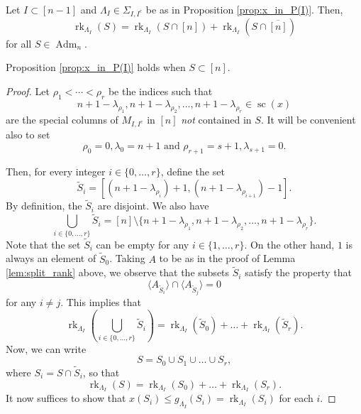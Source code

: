 \documentclass[10pt,a4paper]{amsart}
\DeclareMathOperator{\Adm}{Adm}
\DeclareMathOperator{\SC}{sc}
\DeclareMathOperator{\rk}{rk}
\begin{document}
\begin{lemma}\label{lem:split_rank}
    Let $I \subset [n-1]$ and $\Lambda_I \in \Sigma_{I,I^c}$ be as in Proposition \ref{prop:x_in_P(I)}. Then,
    \begin{equation*}
        \rk_{\Lambda_I}(S) = \rk_{\Lambda_I}(S \cap [n])+ \rk_{\Lambda_I}(S \cap \overline{[n]})
    \end{equation*}
    for all $S \in \Adm_n$.
\end{lemma}

\begin{proposition}\label{prop:S_ineq_positive}
    Proposition \ref{prop:x_in_P(I)} holds when $S\subset[n]$.
\end{proposition}

\begin{proof}
    Let $\rho_1<\cdots<\rho_r$ be the indices such that
\begin{equation*}
    n +1 -\lambda_{\rho_1},n +1 -\lambda_{\rho_2}, \ldots,n +1 -\lambda_{\rho_r} \in \SC(x)
\end{equation*}
are the special columns of $M_{I,I^c}$ in $[n]$ \emph{not} contained in $S$. It will be convenient also to set
\begin{equation*}
    \rho_0=0,\lambda_0=n+1\text{ and }\rho_{r+1}=s+1,\lambda_{s+1}=0.
\end{equation*}

Then, for every integer $i \in \{0, \ldots, r\}$, define the set
\begin{equation*}
    \widetilde{S}_i =[(n+1-\lambda_{\rho_{i}})+1, (n+1-\lambda_{\rho_{i+1}})-1].
\end{equation*}
By definition, the $\widetilde{S}_i$ are disjoint. We also have 
\begin{equation*}
    \bigcup_{i \in \{0, \ldots, r\}} \widetilde{S}_i = [n] \setminus \{n +1 -\lambda_{\rho_1}, n +1 -\lambda_{\rho_2}, \ldots, n +1 -\lambda_{\rho_r}\}.
\end{equation*}
Note that the set $\widetilde{S}_i$ can be empty for any $i \in \{1, \ldots, r\}$. On the other hand, $1$ is always an element of $\widetilde{S}_0$. Taking $A$ to be as in the proof of Lemma \ref{lem:split_rank} above, we observe that the subsets $\widetilde{S}_i$ satisfy the property that 
\begin{equation*}
    \langle A_{\widetilde{S}_i}\rangle \cap \langle A_{\widetilde{S}_j}\rangle = 0
\end{equation*}
for any $i \neq j$. This implies that 
\begin{equation*}
    \rk_{\Lambda_I}\left(\bigcup_{i \in \{0, \ldots, r\}} \widetilde{S}_i\right) = \rk_{\Lambda_I}(\widetilde{S}_0) + \ldots + \rk_{\Lambda_I}(\widetilde{S}_r).
\end{equation*}
Now, we can write
\begin{equation*}
    S = S_0 \cup S_1 \cup \ldots \cup S_r,
\end{equation*}
where $S_i=S\cap \widetilde{S}_i$, so that
\begin{equation*}
    \rk_{\Lambda_I}(S) = \rk_{\Lambda_I}(S_0) + \ldots + \rk_{\Lambda_I}(S_r).
\end{equation*}
It now suffices to show that $x(S_i)\le g_{\Lambda_I}(S_i)= \rk_{\Lambda_I}(S_i)$ for each $i$. 


\end{proof}
\end{document}
